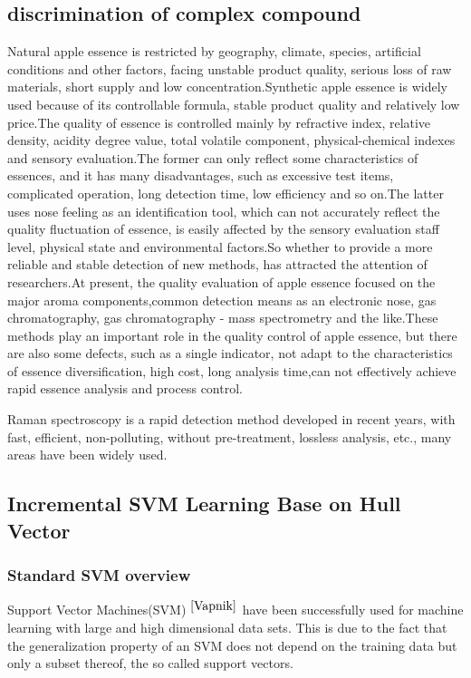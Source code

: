 \documentclass[a4paper]{article}
\begin{document}
    \subsection{discrimination of complex compound}
Natural apple essence is restricted by geography, climate, species, artificial conditions and other factors, facing unstable product quality, serious loss of raw materials, short supply and low concentration.Synthetic apple essence is widely used because of its controllable formula, stable product quality and relatively low price.The quality of essence is controlled mainly by refractive index, relative density, acidity degree value, total volatile component, physical-chemical indexes and sensory evaluation.The former can only reflect some characteristics of essences, and it has many disadvantages, such as excessive test items, complicated operation, long detection time, low efficiency and so on.The latter uses nose feeling as an identification tool, which can not accurately reflect the quality fluctuation of essence, is easily affected by the sensory evaluation staff level, physical state and environmental factors.So whether to provide a more reliable and stable detection of new methods, has attracted the attention of researchers.At present, the quality evaluation of apple essence focused on  the major aroma components,common detection means as an electronic nose, gas chromatography, gas chromatography - mass spectrometry and the like.These methods play an important role in the quality control of apple essence, but there are also some defects, such as a single indicator, not adapt to the characteristics of essence diversification, high cost, long analysis time,can not effectively achieve rapid essence analysis and process control.

Raman spectroscopy is a rapid detection method developed in recent years, with fast, efficient, non-polluting, without pre-treatment, lossless analysis, etc., many areas have been widely used.

    \subsection{Incremental SVM Learning Base on Hull Vector}
    \subsubsection{Standard SVM overview}
Support Vector Machines(SVM) $^{\cite{Vapnik}}$ have been successfully used for machine learning with large and high dimensional data sets. This is due to the fact that the generalization property of an SVM does not depend on the training data but only a subset thereof, the so called support vectors.
\end{document}
